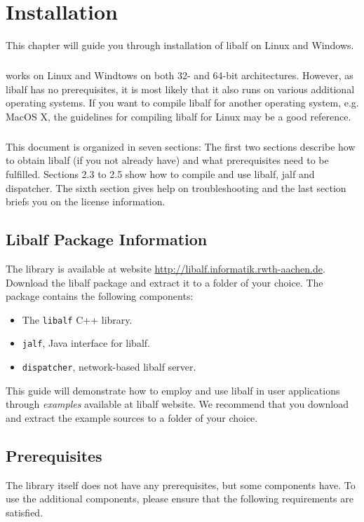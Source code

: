 \chapter{Installation}
This chapter will guide you through installation of libalf on Linux and Windows. 
\paragraph{}
\libalf works on Linux and Windtows on both 32- and 64-bit architectures. However, as libalf has no prerequisites, it is most likely that it also runs on various additional operating systems. If you want to compile libalf for another operating system, e.g. MacOS X, the guidelines for compiling libalf for Linux may be a good reference. 
\paragraph{}
This document is organized in seven sections: The first two sections describe how to obtain libalf (if you not already have) and what prerequisites need to be fulfilled. Sections 2.3 to 2.5 show how to compile and use libalf, jalf and dispatcher. The sixth section gives help on troubleshooting and the last section briefs you on the license information.

\section{Libalf Package Information}
The library is available at \libalf website \url{http://libalf.informatik.rwth-aachen.de}. Download the libalf package and extract it to a folder of your choice. The package contains the following components:
\begin{itemize}
 \item The \texttt{libalf} C++ library.
 \item \texttt{jalf}, Java interface for libalf.
 \item \texttt{dispatcher}, network-based libalf server.
\end{itemize}
This guide will demonstrate how to employ and use libalf in user applications through \emph{examples} available at libalf website. We recommend that you download and extract the example sources to a folder of your choice.

\section{Prerequisites}
The \libalf library itself does not have any prerequisites, but some components have. To use the additional components, please ensure that the following requirements are satisfied.

